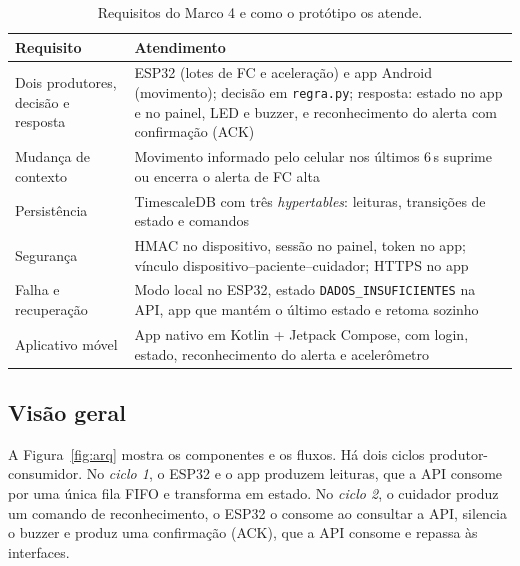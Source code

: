 \documentclass[12pt,a4paper]{article}
\begin{document}
\begin{table}[ht]
\centering\small
\caption{Requisitos do Marco 4 e como o protótipo os atende.}\label{tab:req}
\begin{tabularx}{\textwidth}{@{}p{3.6cm}L@{}}
\toprule
\textbf{Requisito} & \textbf{Atendimento} \\
\midrule
Dois produtores, decisão e resposta & ESP32 (lotes de FC e aceleração) e app Android (movimento); decisão em \texttt{regra.py}; resposta: estado no app e no painel, LED e buzzer, e reconhecimento do alerta com confirmação (ACK) \\
Mudança de contexto & Movimento informado pelo celular nos últimos 6\,s suprime ou encerra o alerta de FC alta \\
Persistência & TimescaleDB com três \emph{hypertables}: leituras, transições de estado e comandos \\
Segurança & HMAC no dispositivo, sessão no painel, token no app; vínculo dispositivo--paciente--cuidador; HTTPS no app \\
Falha e recuperação & Modo local no ESP32, estado \texttt{DADOS\_INSUFICIENTES} na API, app que mantém o último estado e retoma sozinho \\
Aplicativo móvel & App nativo em Kotlin + Jetpack Compose, com login, estado, reconhecimento do alerta e acelerômetro \\
\bottomrule
\end{tabularx}
\end{table}

\subsection{Visão geral}

A Figura~\ref{fig:arq} mostra os componentes e os fluxos.
Há dois ciclos produtor-consumidor.
No \emph{ciclo 1}, o ESP32 e o app produzem leituras, que a API consome por uma única fila FIFO e transforma em estado.
No \emph{ciclo 2}, o cuidador produz um comando de reconhecimento, o ESP32 o consome ao consultar a API, silencia o buzzer e produz uma confirmação (ACK), que a API consome e repassa às interfaces.
\end{document}
